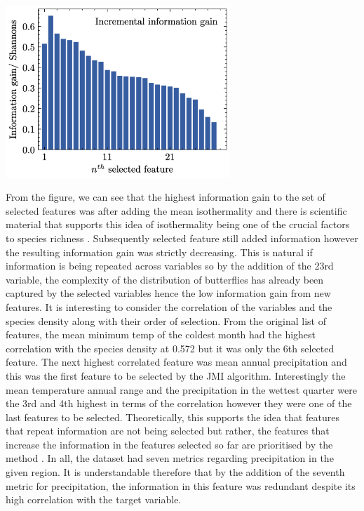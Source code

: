 \documentclass[prl,showpacs,superscriptaddress,twocolumn,longbibliography]{revtex4-1}
\begin{document}
\begin{center}\includegraphics[width=240pt]{Features.png}\end{center}


From the figure, we can see that the highest information gain to the set of selected features was after adding the mean isothermality and there is scientific material that supports this idea of isothermality being one of the crucial factors to species richness \cite{rueda-m_environmental_2021}. Subsequently selected feature still added information however the resulting information gain was strictly decreasing. This is natural if information is being repeated across variables so by the addition of the 23rd variable, the complexity of the distribution of butterflies has already been captured by the selected variables hence the low information gain from new features. 
\newline
\newline
It is interesting to consider the correlation of the variables and the species density along with their order of selection. From the original list of features, the mean minimum temp of the coldest month had the highest correlation with the species density at 0.572 but it was only the 6th selected feature. The next highest correlated feature was mean annual precipitation and this was the first feature to be selected by the JMI algorithm. Interestingly the mean temperature annual range and the precipitation in the wettest quarter were the 3rd and 4th highest in terms of the correlation however they were one of the last features to be selected. Theoretically, this supports the idea that features that repeat information are not being selected but rather, the features that increase the information in the features selected so far are prioritised by the method \cite{afshar_dimensionality_2021}. In all, the dataset had seven metrics regarding precipitation in the given region. It is understandable therefore that by the addition of the seventh metric for precipitation, the information in this feature was redundant despite its high correlation with the target variable.
\end{document}
